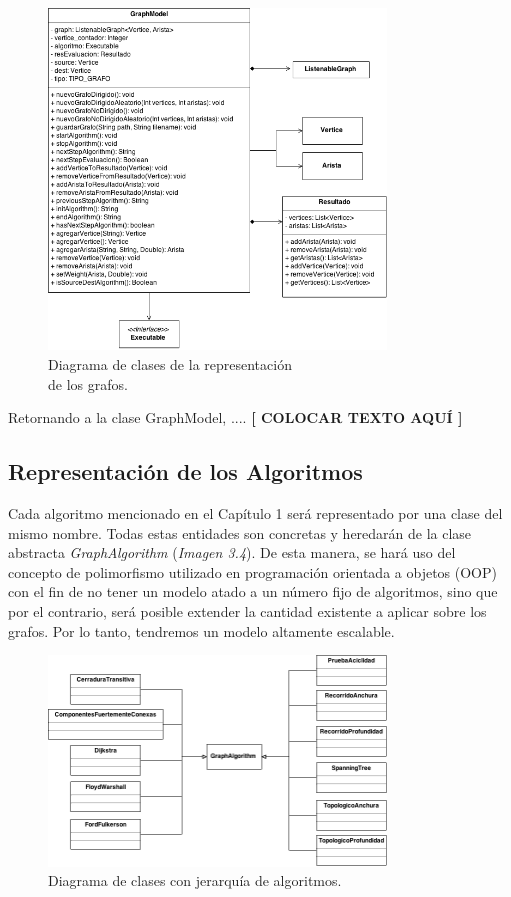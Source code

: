 \documentclass{book}
\begin{document}
\begin{figure}[H]
	\centering
	\includegraphics[width=0.8\textwidth]{images/01-03.png}
	\medskip
	\caption{Diagrama de clases de la representación \\ de los grafos.}
	\medskip
\end{figure}
\bigskip


Retornando a la clase GraphModel, .... \textbf{[ COLOCAR TEXTO AQUÍ ]}
\bigskip



\subsection{Representación de los Algoritmos}

Cada algoritmo mencionado en el Capítulo 1 será representado por una clase del mismo nombre. Todas estas entidades son concretas y heredarán de la clase abstracta \textit{GraphAlgorithm} (\textit{Imagen 3.4}). De esta manera, se hará uso del concepto de polimorfismo utilizado en programación orientada a objetos (OOP) con el fin de no tener un modelo atado a un número fijo de algoritmos, sino que por el contrario, será posible extender la cantidad existente a aplicar sobre los grafos. Por lo tanto, tendremos un modelo altamente escalable.
\bigskip


\begin{figure}[H]
	\centering
	\includegraphics[width=0.8\textwidth]{images/01-04.png}
	\medskip
	\caption{Diagrama de clases con jerarquía de algoritmos.}
	\medskip
\end{figure}
\bigskip
\end{document}
